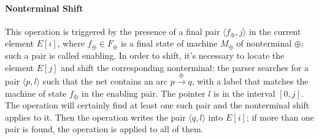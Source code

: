 \paragraph*{Nonterminal Shift}
This operation is triggered by the presence of a final pair $\langle f_\oplus, j \rangle$ in the current element $E[i]$, where $f_\oplus \in F_\oplus$ is a final state of machine $M_\oplus$ of nonterminal $\oplus$;
such a pair is called enabling.
In order to shift, it's necessary to locate the element $E[j]$ and shift the corresponding nonterminal:
the parser searches for a pair $\langle p, l \rangle$ such that the net contains an arc $p \xrightarrow{\oplus} q$, with a label that matches the machine of state $f_\oplus$ in the enabling pair.
The pointer $l$ is in the interval $\left[ 0, j \right]$.
The operation will certainly find at least one such pair and the nonterminal shift applies to it.
Then the operation writes the pair $\langle q, l\rangle$ into $E[i]$; if more than one pair is found, the operation is applied to all of them.

